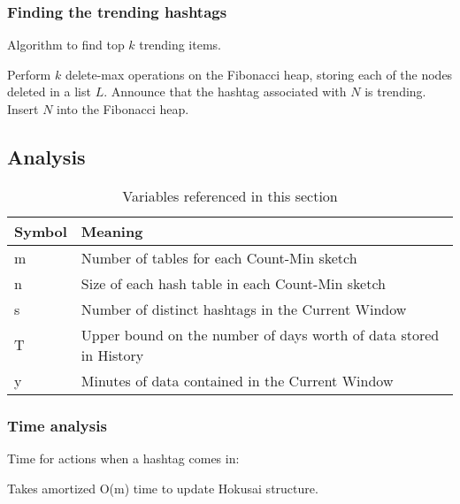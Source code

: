 \documentclass[a4paper,12pt]{article}
\begin{document}
\subsubsection{Finding the trending hashtags}

\begin{algorithm}
\caption{Algorithm to find top $k$ trending items.}
\begin{algorithmic}[1]
\State Perform $k$ delete-max operations on the Fibonacci heap, storing each of the nodes deleted in a list $L$.
	\State Announce that the hashtag associated with $N$ is trending.
	\State Insert $N$ into the Fibonacci heap.
\EndFor
\end{algorithmic}
\end{algorithm}



\subsection{Analysis}


\begin{table}[h]
\caption{Variables referenced in this section}
\begin{tabular}{@{}ll@{}}
\toprule
Symbol & Meaning                                                           \\ \midrule
m      & Number of tables for each Count-Min sketch                        \\
n      & Size of each hash table in each Count-Min sketch                  \\
s      & Number of distinct hashtags in the Current Window                 \\
T      & Upper bound on the number of days worth of data stored in History \\
y      & Minutes of data contained in the Current Window                   \\ \bottomrule
\end{tabular}
\end{table}
\subsubsection{Time analysis}


Time for actions when a hashtag comes in:

	Takes amortized O(m) time to update Hokusai structure.
\end{document}
